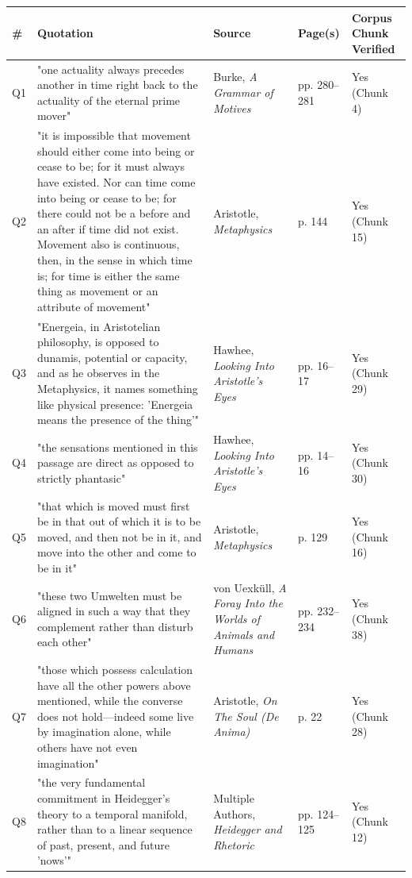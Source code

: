 \begin{center}
\footnotesize
\begin{tabular}{|l|l|l|l|l|}
\hline
\textbf{\#} & \textbf{Quotation} & \textbf{Source} & \textbf{Page(s)} & \textbf{Corpus Chunk Verified} \\
\hline
Q1 & "one actuality always precedes another in time right back to the actuality of the eternal prime mover" & Burke, \textit{A Grammar of Motives} & pp. 280--281 & Yes (Chunk 4) \\
\hline
Q2 & "it is impossible that movement should either come into being or cease to be; for it must always have existed. Nor can time come into being or cease to be; for there could not be a before and an after if time did not exist. Movement also is continuous, then, in the sense in which time is; for time is either the same thing as movement or an attribute of movement" & Aristotle, \textit{Metaphysics} & p. 144 & Yes (Chunk 15) \\
\hline
Q3 & "Energeia, in Aristotelian philosophy, is opposed to dunamis, potential or capacity, and as he observes in the Metaphysics, it names something like physical presence: 'Energeia means the presence of the thing'" & Hawhee, \textit{Looking Into Aristotle's Eyes} & pp. 16--17 & Yes (Chunk 29) \\
\hline
Q4 & "the sensations mentioned in this passage are direct as opposed to strictly phantasic" & Hawhee, \textit{Looking Into Aristotle's Eyes} & pp. 14--16 & Yes (Chunk 30) \\
\hline
Q5 & "that which is moved must first be in that out of which it is to be moved, and then not be in it, and move into the other and come to be in it" & Aristotle, \textit{Metaphysics} & p. 129 & Yes (Chunk 16) \\
\hline
Q6 & "these two Umwelten must be aligned in such a way that they complement rather than disturb each other" & von Uexküll, \textit{A Foray Into the Worlds of Animals and Humans} & pp. 232--234 & Yes (Chunk 38) \\
\hline
Q7 & "those which possess calculation have all the other powers above mentioned, while the converse does not hold---indeed some live by imagination alone, while others have not even imagination" & Aristotle, \textit{On The Soul (De Anima)} & p. 22 & Yes (Chunk 28) \\
\hline
Q8 & "the very fundamental commitment in Heidegger's theory to a temporal manifold, rather than to a linear sequence of past, present, and future 'nows'" & Multiple Authors, \textit{Heidegger and Rhetoric} & pp. 124--125 & Yes (Chunk 12) \\

\end{tabular}
\end{center}
